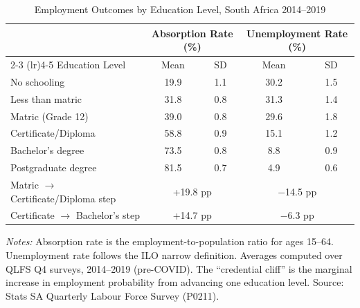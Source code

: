 \begin{table}[H]
\centering
\caption{Employment Outcomes by Education Level, South Africa 2014--2019}
\label{tab:employment_education}
\begin{threeparttable}
\begin{tabular}{lcccc}
\toprule
 & \multicolumn{2}{c}{Absorption Rate (\%)} & \multicolumn{2}{c}{Unemployment Rate (\%)} \\
\cmidrule(lr){2-3} \cmidrule(lr){4-5}
Education Level & Mean & SD & Mean & SD \\
\midrule
No schooling & 19.9 & 1.1 & 30.2 & 1.5 \\
Less than matric & 31.8 & 0.8 & 31.3 & 1.4 \\
Matric (Grade 12) & 39.0 & 0.8 & 29.6 & 1.8 \\
Certificate/Diploma & 58.8 & 0.9 & 15.1 & 1.2 \\
Bachelor's degree & 73.5 & 0.8 & 8.8 & 0.9 \\
Postgraduate degree & 81.5 & 0.7 & 4.9 & 0.6 \\
\midrule
Matric $\rightarrow$ Certificate/Diploma step & \multicolumn{2}{c}{+19.8 pp} & \multicolumn{2}{c}{$-$14.5 pp} \\
Certificate $\rightarrow$ Bachelor's step & \multicolumn{2}{c}{+14.7 pp} & \multicolumn{2}{c}{$-$6.3 pp} \\
\bottomrule
\end{tabular}
\begin{tablenotes}[flushleft]
\small
\item \textit{Notes:} Absorption rate is the employment-to-population ratio for ages 15--64. Unemployment rate follows the ILO narrow definition. Averages computed over QLFS Q4 surveys, 2014--2019 (pre-COVID). The ``credential cliff'' is the marginal increase in employment probability from advancing one education level. Source: Stats SA Quarterly Labour Force Survey (P0211).
\end{tablenotes}
\end{threeparttable}
\end{table}
